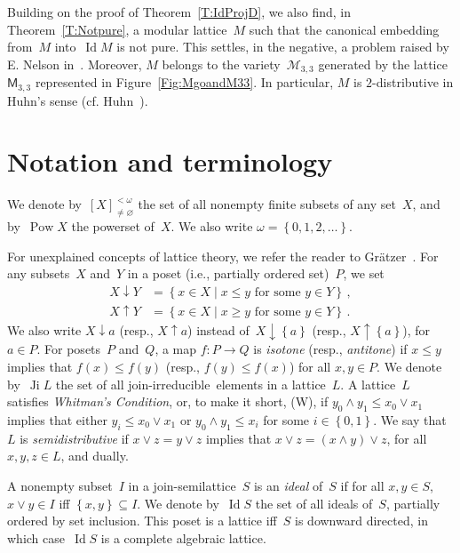 \documentclass[reqno]{amsart}
\numberwithin{equation}{section}
\theoremstyle{plain}
\theoremstyle{definition}
\theoremstyle{remark}
\numberwithin{figure}{section}
\numberwithin{table}{section}
\begin{document}
Building on the proof of Theorem~\ref{T:IdProjD}, we also find, in Theorem~\ref{T:Notpure}, a modular lattice~$M$ such that the canonical embedding from~$M$ into~$\operatorname{Id} M$ is not pure.
This settles, in the negative, a problem raised by E. Nelson in~\cite{Nels74}.
Moreover, $M$ belongs to the variety~${\mathcal{M}}_{3,3}$ generated by the lattice~${{\mathsf{M}}}_{3,3}$ represented in Figure~\ref{Fig:MgoandM33}.
In particular, $M$ is $2$-distributive in Huhn's sense (cf. Huhn~\cite{Huhn72}).

\section{Notation and terminology}\label{S:Basic}

We denote by~${[{X}]_{\neq{\varnothing}}^{<\omega}}$ the set of all nonempty finite subsets of any set~$X$, and by~$\operatorname{Pow}{X}$ the powerset of~$X$.
We also write ${\omega}={\left\{{0,1,2,\dots}\right\}}$.

For unexplained concepts of lattice theory, we refer the reader to Gr\"atzer~\cite{LTF}.
For any subsets~$X$ and~$Y$ in a poset (i.e., partially ordered set)~$P$, we set
 \begin{align*}
 X{\mathbin{\downarrow}} Y&={{\left\{{{{x\in X}}\mid{{x\leq y\text{ for some }y\in Y}}}\right\}}}\,,\\
 X{\mathbin{\uparrow}} Y&={{\left\{{{{x\in X}}\mid{{x\geq y\text{ for some }y\in Y}}}\right\}}}\,. 
 \end{align*}
We also write $X{\mathbin{\downarrow}} a$ (resp., $X{\mathbin{\uparrow}} a$) instead of~$X{\mathbin{\downarrow}}{\left\{{a}\right\}}$ (resp., $X{\mathbin{\uparrow}}{\left\{{a}\right\}}$), for $a\in P$.
For posets~$P$ and~$Q$, a map $f\colon P\to Q$ is \emph{isotone} (resp., \emph{antitone}) if $x\leq y$ implies that $f(x)\leq f(y)$ (resp., $f(y)\leq f(x)$) for all $x,y\in P$.
We denote by~$\operatorname{Ji} L$ the set of all {join-ir\-re\-duc\-i\-ble}\ elements in a lattice~$L$.
A lattice~$L$ satisfies \emph{Whitman's Condition}, or, to make it short, (W), if $y_0\wedge y_1\leq x_0\vee x_1$ implies that either $y_i\leq x_0\vee x_1$ or $y_0\wedge y_1\leq x_i$ for some $i\in{\left\{{0,1}\right\}}$.
We say that~$L$ is \emph{semidistributive} if $x\vee z=y\vee z$ implies that $x\vee z=(x\wedge y)\vee z$, for all $x,y,z\in L$, and dually.

A nonempty subset~$I$ in a {join-semi\-lat\-tice}~$S$ is an \emph{ideal} of~$S$ if for all $x,y\in S$, $x\vee y\in I$ if{f} ${\left\{{x,y}\right\}}\subseteq I$.
We denote by~$\operatorname{Id} S$ the set of all ideals of~$S$, partially ordered by set inclusion.
This poset is a lattice if{f}~$S$ is downward directed, in which case~$\operatorname{Id} S$ is a complete algebraic lattice.
\end{document}
